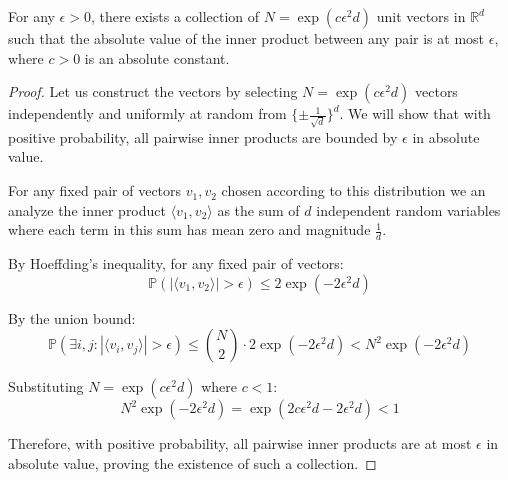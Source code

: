 
\begin{lemma}
\label{lem:exp_many_neearly_orthogoanl_vectors}
For any $\epsilon > 0$, there exists a collection of $N = \exp(c\epsilon^2d)$ unit vectors in $\mathbb{R}^d$ such that the absolute value of the inner product between any pair is at most $\epsilon$, where $c > 0$ is an absolute constant.
\end{lemma}

\begin{proof}
Let us construct the vectors by selecting $N = \exp(c\epsilon^2d)$ vectors independently and uniformly at random from $\{\pm \frac{1}{\sqrt{d}}\}^d$. We will show that with positive probability, all pairwise inner products are bounded by $\epsilon$ in absolute value.

For any fixed pair of vectors $v_1, v_2$ chosen according to this distribution we an analyze the inner product $\langle v_1, v_2 \rangle$ as the sum of $d$ independent random variables where each term in this sum has mean zero and magnitude $\frac{1}{d}$.

By Hoeffding's inequality, for any fixed pair of vectors:
\[
    \mathbb{P}(|\langle v_1, v_2 \rangle| > \epsilon) \leq 2\exp(-2\epsilon^2d)
\]

By the union bound:
\[
    \mathbb{P}(\exists i,j: |\langle v_i, v_j \rangle| > \epsilon) \leq \binom{N}{2} \cdot 2\exp(-2\epsilon^2d) < N^2\exp(-2\epsilon^2d)
\]

Substituting $N = \exp(c\epsilon^2d)$ where $c < 1$:
\[
    N^2\exp(-2\epsilon^2d) = \exp(2c\epsilon^2d - 2\epsilon^2d) < 1
\]

Therefore, with positive probability, all pairwise inner products are at most $\epsilon$ in absolute value, proving the existence of such a collection.
\end{proof}
